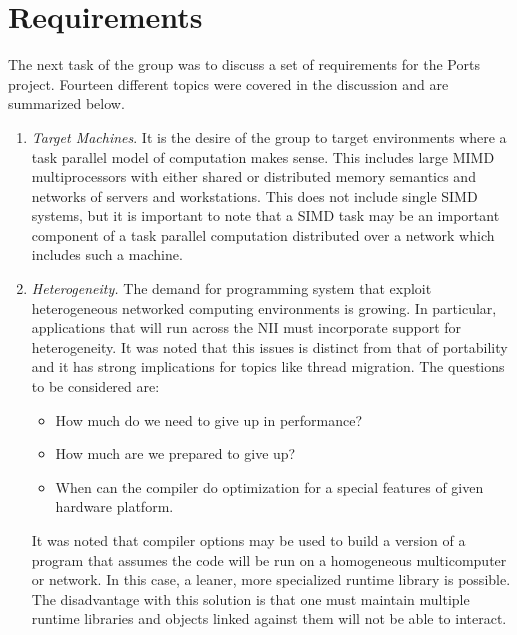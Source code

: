 \section{Requirements}

The next task of the group was to discuss a set of requirements
for the Ports project.  Fourteen different topics were covered
in the discussion and are summarized below.

\begin{enumerate}
\item
{\em Target Machines}.  It is the desire of the group to target environments
where a task parallel model of computation makes sense.  This
includes large MIMD multiprocessors  with either shared or distributed
memory semantics and networks of servers and workstations.
This does not include single SIMD systems, but it is important
to note that a SIMD task may be an important component of a task
parallel computation distributed over a network which includes
such a machine.

\item
{\em Heterogeneity.}  The demand for programming system that exploit
heterogeneous networked computing environments is growing.  In particular,
applications that will run across the NII must incorporate support
for heterogeneity.  It was noted that this issues
is distinct from that of portability and it has strong implications
for topics like thread migration.
The questions to be considered are:
\begin{itemize}
\item How much do we need to give up in performance?
\item How much are we prepared to give up?
\item When can the compiler do optimization for a special features
of given hardware platform.
\end{itemize}
It was noted that compiler options may be used to build a version
of a program that assumes the code will be run on a homogeneous 
multicomputer or network.  In this case, a leaner, more specialized
runtime library
is possible.  The disadvantage with this solution is that one
must maintain multiple runtime libraries and objects linked against
them will not be able to interact.


\end{enumerate}
